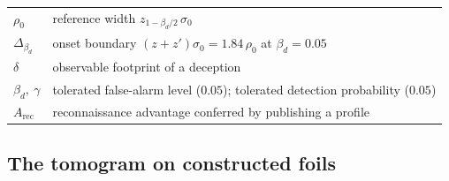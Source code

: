\begin{table}[t]
\begin{tabular}{@{}p{}p{}@{}}
$\rho_0$ & reference width $z_{1-\beta_d/2}\,\sigma_0$ \\
$\Delta_{\beta_d}$ & onset boundary $(z+z')\sigma_0=1.84\,\rho_0$ at $\beta_d=0.05$ \\
$\delta$ & observable footprint of a deception \\
$\beta_d,\ \gamma$ & tolerated false-alarm level ($0.05$); tolerated detection probability ($0.05$) \\
$A_{\mathrm{rec}}$ & reconnaissance advantage conferred by publishing a profile \\
\bottomrule
\end{tabular}
\end{table}

\subsection{The tomogram on constructed foils}


